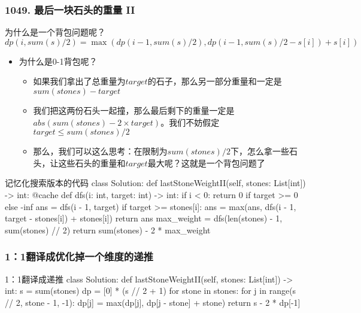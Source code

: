 \begin{frame}[fragile]          %
  \frametitle{\textsc{1049. 最后一块石头的重量 II}}
  \begin{alertblock}{为什么是一个背包问题呢？}
    \begin{equation*}
      dp(i, sum(s) / 2)=\max(dp(i-1,sum(s) / 2),dp(i-1,sum(s) / 2 - s[i]) + s[i])
    \end{equation*}
  \end{alertblock}
  \begin{itemize}
    \item 为什么是0-1背包呢？
      \begin{itemize}
        \item 如果我们拿出了总重量为$target$的石子，那么另一部分重量和一定是$sum(stones)-target$
        \item 我们把这两份石头一起撞，那么最后剩下的重量一定是$abs(sum(stones) - 2 \times target)$。我们不妨假定$target \leq sum(stones) / 2$
        \item 那么，我们可以这么思考：在限制为$sum(stones)/2$下，怎么拿一些石头，让这些石头的重量和$target$最大呢？这就是一个背包问题了
      \end{itemize}
  \end{itemize}
\end{frame}


\begin{frame}[fragile]
  \begin{codeblock}[language=python]{记忆化搜索版本的代码}
class Solution:
    def lastStoneWeightII(self, stones: List[int]) -> int:
        @cache
        def dfs(i: int, target: int) -> int:
            if i < 0:
                return 0 if target >= 0 else -inf
            ans = dfs(i - 1, target)
            if target >= stones[i]:
                ans = max(ans, dfs(i - 1, target - stones[i]) + stones[i])
            return ans
        max_weight = dfs(len(stones) - 1, sum(stones) // 2)
        return sum(stones) - 2 * max_weight
  \end{codeblock}
\end{frame}


\begin{frame}[fragile]
  \frametitle{1：1翻译成优化掉一个维度的递推}
  \begin{codeblock}[language=python]{1：1翻译成递推}
class Solution:
    def lastStoneWeightII(self, stones: List[int]) -> int:
        s = sum(stones)
        dp = [0] * (s // 2 + 1)
        for stone in stones:
            for j in range(s // 2, stone - 1, -1):
                dp[j] = max(dp[j], dp[j - stone] + stone)
        return s - 2 * dp[-1]
  \end{codeblock}
\end{frame}

